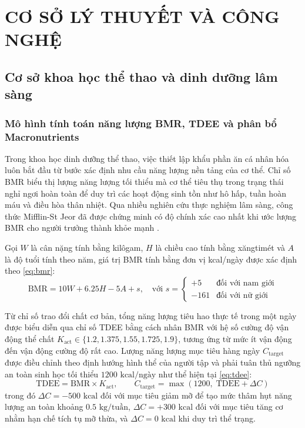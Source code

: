 
\chapter{CƠ SỞ LÝ THUYẾT VÀ CÔNG NGHỆ}
\label{chap:cossolythuyet}

\section{Cơ sở khoa học thể thao và dinh dưỡng lâm sàng}
\label{sec:khoahoc_thethao}

\subsection{Mô hình tính toán năng lượng BMR, TDEE và phân bổ Macronutrients}
\label{subsec:bmr_tdee}

Trong khoa học dinh dưỡng thể thao, việc thiết lập khẩu phần ăn cá nhân hóa luôn bắt đầu từ bước xác định nhu cầu năng lượng nền tảng của cơ thể. Chỉ số BMR biểu thị lượng năng lượng tối thiểu mà cơ thể tiêu thụ trong trạng thái nghỉ ngơi hoàn toàn để duy trì các hoạt động sinh tồn như hô hấp, tuần hoàn máu và điều hòa thân nhiệt. Qua nhiều nghiên cứu thực nghiệm lâm sàng, công thức Mifflin-St Jeor đã được chứng minh có độ chính xác cao nhất khi ước lượng BMR cho người trưởng thành khỏe mạnh \cite{mifflin1990new}.

Gọi $W$ là cân nặng tính bằng kilôgam, $H$ là chiều cao tính bằng xăngtimét và $A$ là độ tuổi tính theo năm, giá trị BMR tính bằng đơn vị kcal/ngày được xác định theo \cref{eq:bmr}:
\begin{equation}
    \text{BMR} = 10W + 6.25H - 5A + s, \quad \text{với } s = \begin{cases} +5 & \text{đối với nam giới} \\ -161 & \text{đối với nữ giới} \end{cases}
    \label{eq:bmr}
\end{equation}

Từ chỉ số trao đổi chất cơ bản, tổng năng lượng tiêu hao thực tế trong một ngày được biểu diễn qua chỉ số TDEE bằng cách nhân BMR với hệ số cường độ vận động thể chất $K_{\text{act}} \in \{1.2, 1.375, 1.55, 1.725, 1.9\}$, tương ứng từ mức ít vận động đến vận động cường độ rất cao. Lượng năng lượng mục tiêu hàng ngày $C_{\text{target}}$ được điều chỉnh theo định hướng hình thể của người tập và phải tuân thủ ngưỡng an toàn sinh học tối thiểu $1200\text{ kcal/ngày}$ như thể hiện tại \cref{eq:tdee}:
\begin{equation}
    \text{TDEE} = \text{BMR} \times K_{\text{act}}, \qquad C_{\text{target}} = \max\left(1200,\; \text{TDEE} + \Delta C\right)
    \label{eq:tdee}
\end{equation}
trong đó $\Delta C = -500\text{ kcal}$ đối với mục tiêu giảm mỡ để tạo mức thâm hụt năng lượng an toàn khoảng $0.5\text{ kg/tuần}$, $\Delta C = +300\text{ kcal}$ đối với mục tiêu tăng cơ nhằm hạn chế tích tụ mỡ thừa, và $\Delta C = 0\text{ kcal}$ khi duy trì thể trạng.

